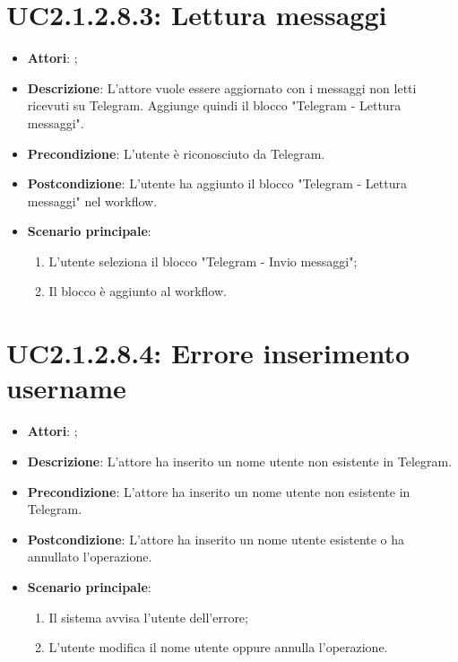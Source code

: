 \section{UC2.1.2.8.3: Lettura messaggi }
\label{UC2.1.2.8.3}
\begin{itemize}
	\item \textbf{Attori}: ;
	\item \textbf{Descrizione}: L'attore vuole essere aggiornato con i messaggi non letti ricevuti su Telegram. Aggiunge quindi il blocco "Telegram - Lettura messaggi".
	\item \textbf{Precondizione}: L'utente è riconosciuto da Telegram.
	\item \textbf{Postcondizione}: L'utente ha aggiunto il blocco "Telegram - Lettura messaggi" nel workflow.
	\item \textbf{Scenario principale}:
	\begin{enumerate} \item L'utente seleziona il blocco "Telegram - Invio messaggi";  \item  Il blocco è aggiunto al workflow.\end{enumerate}
\end{itemize}

\section{UC2.1.2.8.4: Errore inserimento username}
\label{UC2.1.2.8.4}
\begin{itemize}
	\item \textbf{Attori}: ;
	\item \textbf{Descrizione}: L'attore ha inserito un nome utente non esistente in Telegram.
	\item \textbf{Precondizione}: L'attore ha inserito un nome utente non esistente in Telegram.
	\item \textbf{Postcondizione}: L'attore ha inserito un nome utente esistente o ha annullato l'operazione.
	\item \textbf{Scenario principale}:
	\begin{enumerate} \item Il sistema avvisa l'utente dell'errore;  \item  L'utente modifica il nome utente oppure annulla l'operazione.\end{enumerate}
\end{itemize}

